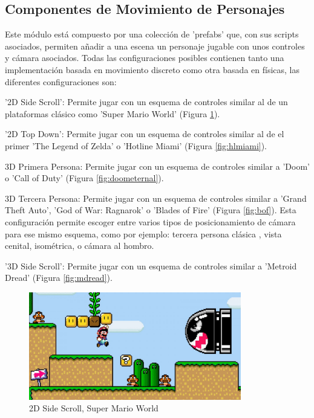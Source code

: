 \subsection{Componentes de Movimiento de Personajes}
Este módulo está compuesto por una colección de 'prefabs' que, con sus scripts asociados, permiten añadir a una escena un personaje jugable con unos controles y cámara asociados.
Todas las configuraciones posibles contienen tanto una implementación basada en movimiento discreto como otra basada en físicas, las diferentes configuraciones son: 
\begin{compactitem}
  \item '2D Side Scroll': Permite jugar con un esquema de controles similar al de un plataformas clásico como 'Super Mario World' (Figura \ref{fig:smbw}).
  \item '2D Top Down': Permite jugar con un esquema de controles similar al de el primer 'The Legend of Zelda' o 'Hotline Miami' (Figura \ref{fig:hlmiami}).
  \item 3D Primera Persona: Permite jugar con un esquema de controles similar a 'Doom' o 'Call of Duty' (Figura \ref{fig:doometernal}).
  \item 3D Tercera Persona: Permite jugar con un esquema de controles similar a 'Grand Theft Auto', 'God of War: Ragnarok' o 'Blades of Fire' (Figura \ref{fig:bof}). Esta configuración permite escoger entre varios 
   tipos de posicionamiento de cámara para ese mismo esquema, como por ejemplo: tercera persona clásica , vista cenital, isométrica, o cámara al hombro. 
  \item '3D Side Scroll': Permite jugar con un esquema de controles similar a 'Metroid Dread' (Figura \ref{fig:mdread}).
\end{compactitem}
\raggedbottom
\begin{figure}[H]
  \centering
    \includegraphics[width=350px,clip=true]{super_mario_world.jpg}
  \caption{2D Side Scroll, Super Mario World}
  \label{fig:smbw}
\end{figure}

